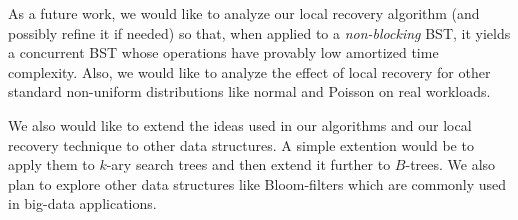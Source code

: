 As a future work, we would like to analyze our local recovery algorithm (and possibly refine it if needed) so that, when applied to a \emph{non-blocking} BST, it yields a concurrent BST whose operations have provably low amortized time complexity. Also, we would like to analyze the effect of local recovery for other standard non-uniform distributions like normal and Poisson on real workloads.

We also would like to extend the ideas used in our algorithms and our local recovery technique to other data structures. A simple extention would be to apply them to $k$-ary search trees and then extend it further to $B$-trees. We also plan to explore other data structures like Bloom-filters which are commonly used in big-data applications.